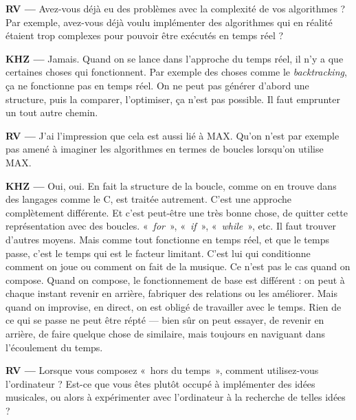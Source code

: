 \documentclass[a4paper,12pt]{article}
\newcommand{\guill}[1]{«~#1~»}
\begin{document}
\textbf{RV ---} Avez-vous déjà eu des problèmes avec la complexité de vos algorithmes ? Par exemple, avez-vous déjà voulu implémenter des algorithmes qui en réalité étaient trop complexes pour pouvoir être exécutés en temps réel ?

\textbf{KHZ ---} Jamais. Quand on se lance dans l'approche du temps réel, il n'y a que certaines choses qui fonctionnent. Par exemple des choses comme le \emph{backtracking}, ça ne fonctionne pas en temps réel. On ne peut pas générer d'abord une structure, puis la comparer, l'optimiser, ça n'est pas possible. Il faut emprunter un tout autre chemin.

\textbf{RV ---} J'ai l'impression que cela est aussi lié à MAX. Qu'on n'est par exemple pas amené à imaginer les algorithmes en termes de boucles lorsqu'on utilise MAX.

\textbf{KHZ ---} Oui, oui. En fait la structure de la boucle, comme on en trouve dans des langages comme le C, est traitée autrement. C'est une approche complètement différente. Et c'est peut-être une très bonne chose, de quitter cette représentation avec des boucles. \guill{\emph{for}}, \guill{\emph{if}}, \guill{\emph{while}}, etc. Il faut trouver d'autres moyens. Mais comme tout fonctionne en temps réel, et que le temps passe, c'est le temps qui est le facteur limitant. C'est lui qui conditionne comment on joue ou comment on fait de la musique. Ce n'est pas le cas quand on compose. Quand on compose, le fonctionnement de base est différent : on peut à chaque instant revenir en arrière, fabriquer des relations ou les améliorer. Mais quand on improvise, en direct, on est obligé de travailler avec le temps. Rien de ce qui se passe ne peut être répté --- bien sûr on peut essayer, de revenir en arrière, de faire quelque chose de similaire, mais toujours en naviguant dans l'écoulement du temps.

\textbf{RV ---} Lorsque vous composez \guill{hors du temps}, comment utilisez-vous l'ordinateur ? Est-ce que vous êtes plutôt occupé à implémenter des idées musicales, ou alors à expérimenter avec l'ordinateur à la recherche de telles idées ?
\end{document}
